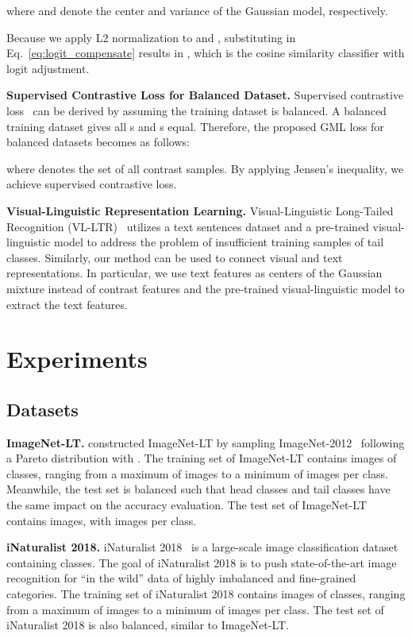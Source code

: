 \documentclass{article}
\theoremstyle{plain}
\theoremstyle{definition}
\theoremstyle{remark}
\begin{document}
where  and  denote the center and variance of the Gaussian model, respectively.

Because we apply L2 normalization to  and , substituting  in Eq.~\ref{eq:logit_compensate} results in , which is the cosine similarity classifier with logit adjustment.

\textbf{Supervised Contrastive Loss for Balanced Dataset.} Supervised contrastive loss~\cite{khosla2020supervised} can be derived by assuming the training dataset is balanced. A balanced training dataset gives all s and s equal. Therefore, the proposed GML loss for balanced datasets becomes as follows:

where  denotes the set of all contrast samples. By applying Jensen's inequality, we achieve supervised contrastive loss.

\textbf{Visual-Linguistic Representation Learning.} Visual-Linguistic Long-Tailed Recognition (VL-LTR)~\cite{tian2021vl} utilizes a text sentences dataset and a pre-trained visual-linguistic model to address the problem of insufficient training samples of tail classes. Similarly, our method can be used to connect visual and text representations. In particular, we use text features as centers of the Gaussian mixture instead of contrast features and the pre-trained visual-linguistic model to extract the text features. \section{Experiments}
\subsection{Datasets}
\textbf{ImageNet-LT.} \citet{liu2019large} constructed ImageNet-LT by sampling ImageNet-2012~\cite{russakovsky2015imagenet} following a Pareto distribution with . The training set of ImageNet-LT contains  images of  classes, ranging from a maximum of  images to a minimum of  images per class. Meanwhile, the test set is balanced such that head classes and tail classes have the same impact on the accuracy evaluation. The test set of ImageNet-LT contains  images, with  images per class.

\textbf{iNaturalist 2018.} iNaturalist 2018~\cite{van2018inaturalist} is a large-scale image classification dataset containing  classes. The goal of iNaturalist 2018 is to push state-of-the-art image recognition for ``in the wild'' data of highly imbalanced and fine-grained categories. The training set of iNaturalist 2018 contains  images of  classes, ranging from a maximum of  images to a minimum of  images per class. The test set of iNaturalist 2018 is also balanced, similar to ImageNet-LT.
\end{document}
